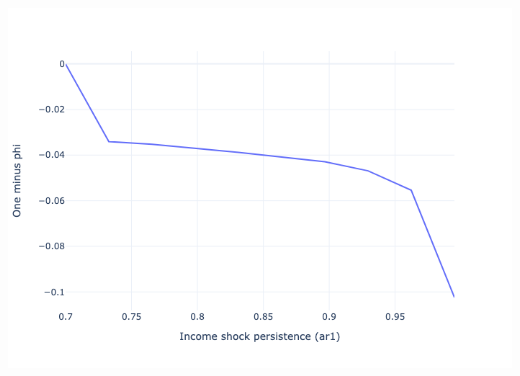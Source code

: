 \begin{questions}
\begin{solution}
\includegraphics[scale=0.5]{figures/insurance_question.png}

\end{solution}
\end{questions}


